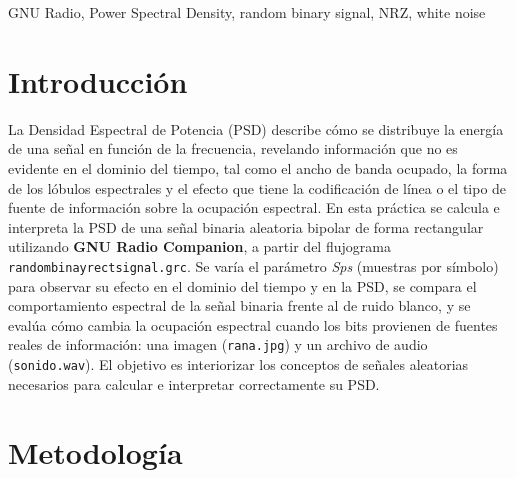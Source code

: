 \documentclass[twocolumn]{IEEEtran}
\begin{document}
\begin{IEEEkeywords}
GNU Radio, Power Spectral Density, random binary signal, NRZ, white noise
\end{IEEEkeywords}


\section{Introducción}

La Densidad Espectral de Potencia (PSD) describe cómo se distribuye la energía de una señal en función de la frecuencia, revelando información que no es evidente en el dominio del tiempo, tal como el ancho de banda ocupado, la forma de los lóbulos espectrales y el efecto que tiene la codificación de línea o el tipo de fuente de información sobre la ocupación espectral. En esta práctica se calcula e interpreta la PSD de una señal binaria aleatoria bipolar de forma rectangular utilizando \textbf{GNU Radio Companion}, a partir del flujograma \texttt{randombinayrectsignal.grc}. Se varía el parámetro \emph{Sps} (muestras por símbolo) para observar su efecto en el dominio del tiempo y en la PSD, se compara el comportamiento espectral de la señal binaria frente al de ruido blanco, y se evalúa cómo cambia la ocupación espectral cuando los bits provienen de fuentes reales de información: una imagen (\texttt{rana.jpg}) y un archivo de audio (\texttt{sonido.wav}). El objetivo es interiorizar los conceptos de señales aleatorias necesarios para calcular e interpretar correctamente su PSD.





\section{Metodología}
\end{document}
